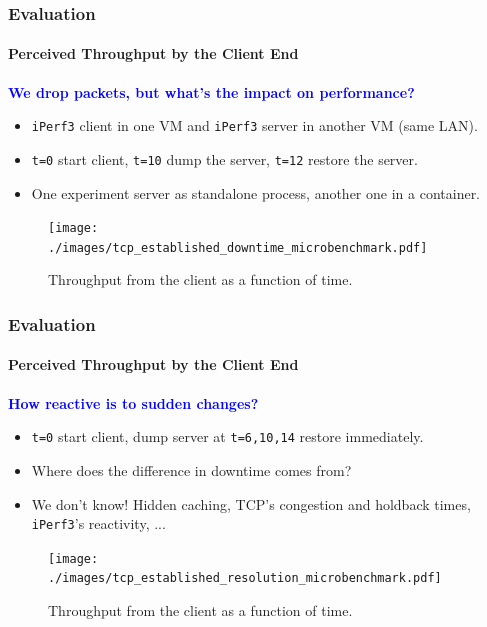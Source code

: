 \documentclass[9pt,    %
    english,            %
    xcolor=table,       %
    envcountsect,        %
    aspectratio=169     %
]{beamer}
\begin{document}
\begin{frame}
    \frametitle{Evaluation}
    \framesubtitle{Perceived Throughput by the Client End}

    \vspace{10pt}

    \textbf{\textcolor{blue}{We drop packets, but what's the impact on performance?}}
    \begin{itemize}
        \item \texttt{iPerf3} client in one VM and \texttt{iPerf3} server in another VM (same LAN).
        \item \texttt{t=0} start client, \texttt{t=10} dump the server, \texttt{t=12} restore the server.
        \item One experiment server as standalone process, another one in a container.
    \end{itemize}

    \vspace{-5pt}

    \begin{figure}
        \centering
        \texttt{[image: ./images/tcp\_established\_downtime\_microbenchmark.pdf]}
        \caption{Throughput from the client as a function of time.\label{fig:evaluation-downtime}}
    \end{figure}
    
\end{frame}

\begin{frame}
    \frametitle{Evaluation}
    \framesubtitle{Perceived Throughput by the Client End}

    \vspace{10pt}

    \textbf{\textcolor{blue}{How reactive is to sudden changes?}}
    \begin{itemize}
        \item \texttt{t=0} start client, dump server at \texttt{t=6,10,14} restore immediately.
        \item Where does the difference in downtime comes from?
        \item We don't know! Hidden caching, TCP's congestion and holdback times, \texttt{iPerf3}'s reactivity, ...
    \end{itemize}

    \vspace{-5pt}

    \begin{figure}
        \centering
        \texttt{[image: ./images/tcp\_established\_resolution\_microbenchmark.pdf]}
        \caption{Throughput from the client as a function of time.\label{fig:evaluation-downtime}}
    \end{figure}
    
\end{frame}
\end{document}
